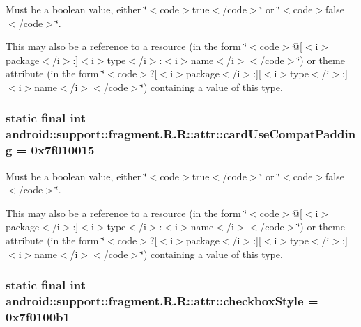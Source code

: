 Must be a boolean value, either \char`\"{}$<$code$>$true$<$/code$>$\char`\"{} or \char`\"{}$<$code$>$false$<$/code$>$\char`\"{}. 

This may also be a reference to a resource (in the form \char`\"{}$<$code$>$@\mbox{[}$<$i$>$package$<$/i$>$:\mbox{]}$<$i$>$type$<$/i$>$:$<$i$>$name$<$/i$>$$<$/code$>$\char`\"{}) or theme attribute (in the form \char`\"{}$<$code$>$?\mbox{[}$<$i$>$package$<$/i$>$:\mbox{]}\mbox{[}$<$i$>$type$<$/i$>$:\mbox{]}$<$i$>$name$<$/i$>$$<$/code$>$\char`\"{}) containing a value of this type. \hypertarget{classandroid_1_1support_1_1fragment_1_1_r_1_1attr_991cb4eef64a92d245779656c86c784e}{
\subsubsection[{cardUseCompatPadding}]{\setlength{\rightskip}{0pt plus 5cm}static final int android::support::fragment.R.R::attr::cardUseCompatPadding = 0x7f010015}}
\label{classandroid_1_1support_1_1fragment_1_1_r_1_1attr_991cb4eef64a92d245779656c86c784e}


Must be a boolean value, either \char`\"{}$<$code$>$true$<$/code$>$\char`\"{} or \char`\"{}$<$code$>$false$<$/code$>$\char`\"{}. 

This may also be a reference to a resource (in the form \char`\"{}$<$code$>$@\mbox{[}$<$i$>$package$<$/i$>$:\mbox{]}$<$i$>$type$<$/i$>$:$<$i$>$name$<$/i$>$$<$/code$>$\char`\"{}) or theme attribute (in the form \char`\"{}$<$code$>$?\mbox{[}$<$i$>$package$<$/i$>$:\mbox{]}\mbox{[}$<$i$>$type$<$/i$>$:\mbox{]}$<$i$>$name$<$/i$>$$<$/code$>$\char`\"{}) containing a value of this type. \hypertarget{classandroid_1_1support_1_1fragment_1_1_r_1_1attr_86cfbdee5dafaa0b672ba1948def389a}{
\subsubsection[{checkboxStyle}]{\setlength{\rightskip}{0pt plus 5cm}static final int android::support::fragment.R.R::attr::checkboxStyle = 0x7f0100b1}}
\label{classandroid_1_1support_1_1fragment_1_1_r_1_1attr_86cfbdee5dafaa0b672ba1948def389a}


